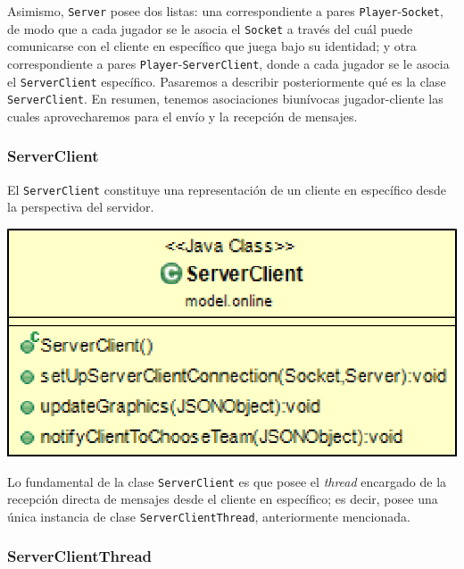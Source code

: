 \documentclass[../DocumentoOficial.tex]{subfiles}
\begin{document}
Asimismo, \texttt{Server} posee dos listas: una correspondiente a pares \texttt{Player}-\texttt{Socket}, de modo que a cada jugador se le asocia el \texttt{Socket} a través del cuál puede comunicarse con el cliente en específico que juega bajo su identidad; y otra correspondiente a pares \texttt{Player}-\texttt{ServerClient}, donde a cada jugador se le asocia el \texttt{ServerClient} específico. Pasaremos a describir posteriormente qué es la clase \texttt{ServerClient}.
En resumen, tenemos asociaciones biunívocas jugador-cliente las cuales aprovecharemos para el envío y la recepción de mensajes.

\subsubsection{ServerClient}
El \texttt{ServerClient} constituye una representación de un cliente en específico desde la perspectiva del servidor. 

\begin{center}
\includegraphics[scale=0.3]{ServerClient-sprint7.png} 
\end{center}

Lo fundamental de la clase \texttt{ServerClient} es que posee el \textit{thread} encargado de la recepción directa de mensajes desde el cliente en específico; es decir, posee una única instancia de clase \texttt{ServerClientThread}, anteriormente mencionada.

\subsubsection{ServerClientThread}
\end{document}
